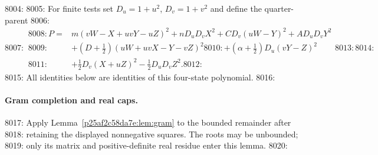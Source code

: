 8004: 
8005: For finite tests set $D_u=1+u^2$, $D_v=1+v^2$ and define the quarter-parent
8006: \begin{equation}
8007:  \begin{split}
8008:  P={}&m(vW-X+uvY-uZ)^2+nD_uD_vX^2+CD_v(uW-Y)^2+AD_uD_vY^2\\
8009:  &+(D+\tfrac12)(uW+uvX-Y-vZ)^2
8010:  +(\alpha+\tfrac12)D_u(vY-Z)^2\\
8011:  &+\tfrac12D_v(X+uZ)^2-\tfrac12D_uD_vZ^2.
8012:  \end{split}
8013:  \label{eq:c2-ba-parent}
8014: \end{equation}
8015: All identities below are identities of this four-state polynomial.
8016: \paragraph{Gram completion and real caps.}
8017: Apply Lemma~\ref{p25af2c58da7e:lem:gram} to the bounded remainder after
8018: retaining the displayed nonnegative squares. The roots may be unbounded;
8019: only its matrix and positive-definite real residue enter this lemma.
8020:
